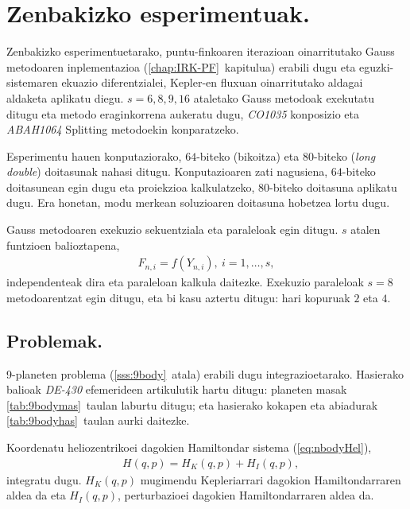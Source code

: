 \section{Zenbakizko esperimentuak.}
\label{s:7espmt}

Zenbakizko esperimentuetarako, puntu-finkoaren iterazioan oinarritutako Gauss metodoaren inplementazioa (\ref{chap:IRK-PF}~kapitulua) erabili dugu eta eguzki-sistemaren ekuazio diferentzialei, Kepler-en fluxuan oinarritutako aldagai aldaketa aplikatu diegu. $s=6,8,9,16$ ataletako Gauss metodoak exekutatu ditugu eta metodo eraginkorrena aukeratu dugu, \emph{CO1035} konposizio eta \emph{ABAH1064} Splitting  metodoekin konparatzeko.

Esperimentu hauen konputaziorako, $64$-biteko (bikoitza) eta $80$-biteko (\emph{long double}) doitasunak nahasi ditugu. Konputazioaren zati nagusiena, $64$-biteko doitasunean egin dugu eta proiekzioa kalkulatzeko, $80$-biteko doitasuna aplikatu dugu. Era honetan, modu merkean soluzioaren doitasuna hobetzea lortu dugu.

Gauss metodoaren exekuzio sekuentziala eta paraleloak egin ditugu. $s$ atalen funtzioen balioztapena, 
\begin{align*}
F_{n,i}=f(Y_{n,i}), \ i=1,\dots,s,
\end{align*}      
independenteak dira eta paraleloan kalkula daitezke. Exekuzio paraleloak $s=8$ metodoarentzat egin ditugu, eta bi kasu aztertu ditugu: hari kopuruak $2$ eta $4$. 

\subsection{Problemak.}


9-planeten problema (\ref{sss:9body}~atala) erabili dugu integrazioetarako. Hasierako balioak \emph{DE-430} efemerideen artikulutik hartu ditugu: planeten masak  \ref{tab:9bodymas}~taulan laburtu ditugu; eta hasierako kokapen eta abiadurak \ref{tab:9bodyhas}~taulan aurki daitezke.

Koordenatu heliozentrikoei dagokien  Hamiltondar sistema (\ref{eq:nbodyHel}),
\begin{align*}
&H(q,p)=H_K(q,p)+H_I(q,p),
\end{align*}
integratu dugu. $H_K(q,p)$ mugimendu Kepleriarrari dagokion Hamiltondarraren aldea da  eta $H_I(q,p)$, perturbazioei dagokien Hamiltondarraren aldea da. 

